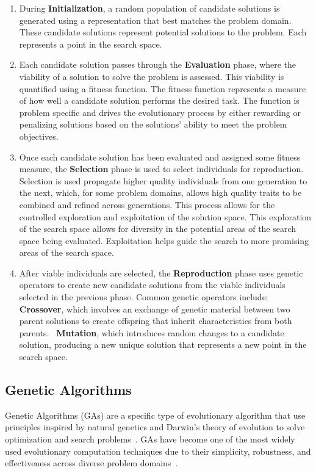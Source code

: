 \documentclass[a4paper,12pt]{article}
\begin{document}
\begin{enumerate}
   \item During \textbf{Initialization}, a random population of candidate solutions is generated using a representation that best matches the problem domain. 
   These candidate solutions represent potential solutions to the problem. 
   Each represents a point in the search space.
   \item Each candidate solution passes through the \textbf{Evaluation} phase, where the viability of a solution to solve the problem is assessed. 
   This viability is quantified using a fitness function.
   The fitness function represents a measure of how well a candidate solution performs the desired task. 
   The function is problem specific and drives the evolutionary process by either rewarding or penalizing solutions based on the solutions' ability to meet the problem objectives.
   \item Once each candidate solution has been evaluated and assigned some fitness measure, the \textbf{Selection} phase is used to select individuals for reproduction. 
   Selection is used propagate higher quality individuals from one generation to the next, which,
   for some problem domains, allows high quality traits to be combined and refined across generations. 
   This process allows for the controlled exploration and exploitation of the solution space. 
   This exploration of the search space allows for diversity in the potential areas of the search space being evaluated.
   Exploitation helps guide the search to more promising areas of the search space.~\cite{EAs}
   \item After viable individuals are selected, the \textbf{Reproduction} phase uses genetic operators to create new candidate solutions from the viable individuals selected in the previous phase.
   Common genetic operators include: \textbf{Crossover}, which involves an exchange of genetic material between two parent solutions to create offspring that inherit characteristics from both parents.~\cite{EAs}
   \textbf{Mutation}, which introduces random changes to a candidate solution, producing a new unique solution that represents a new point in the search space.~\cite{EAs} 
\end{enumerate}

\subsection{Genetic Algorithms}
Genetic Algorithms (GAs) are a specific type of evolutionary algorithm that use principles inspired by natural genetics and Darwin's theory of evolution to solve optimization and search problems~\cite{EAs}.
GAs have become one of the most widely used evolutionary computation techniques due to their simplicity, robustness, and effectiveness across diverse problem domains~\cite{ECR}.
\end{document}
